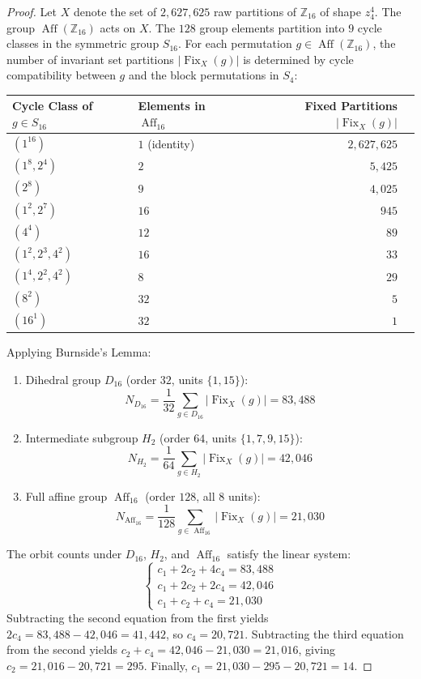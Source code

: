 \begin{proof}
Let $X$ denote the set of $2{,}627{,}625$ raw partitions of $\mathbb{Z}_{16}$ of shape $z_4^4$. The group $\operatorname{Aff}(\mathbb{Z}_{16})$ acts on $X$. The $128$ group elements partition into $9$ cycle classes in the symmetric group $S_{16}$. For each permutation $g \in \operatorname{Aff}(\mathbb{Z}_{16})$, the number of invariant set partitions $|\operatorname{Fix}_X(g)|$ is determined by cycle compatibility between $g$ and the block permutations in $S_4$:
\begin{center}
\begin{tabular}{llrr}
\toprule
Cycle Class of $g \in S_{16}$ & Elements in $\operatorname{Aff}_{16}$ & Fixed Partitions $|\operatorname{Fix}_X(g)|$ \\
\midrule
$(1^{16})$ & $1$ (identity) & $2{,}627{,}625$ \\
$(1^8, 2^4)$ & $2$ & $5{,}425$ \\
$(2^8)$ & $9$ & $4{,}025$ \\
$(1^2, 2^7)$ & $16$ & $945$ \\
$(4^4)$ & $12$ & $89$ \\
$(1^2, 2^3, 4^2)$ & $16$ & $33$ \\
$(1^4, 2^2, 4^2)$ & $8$ & $29$ \\
$(8^2)$ & $32$ & $5$ \\
$(16^1)$ & $32$ & $1$ \\
\bottomrule
\end{tabular}
\end{center}
Applying Burnside's Lemma:
\begin{enumerate}
    \item Dihedral group $D_{16}$ (order $32$, units $\{1, 15\}$):
    \[
    N_{D_{16}} = \frac{1}{32} \sum_{g \in D_{16}} |\operatorname{Fix}_X(g)| = 83{,}488
    \]
    \item Intermediate subgroup $H_2$ (order $64$, units $\{1, 7, 9, 15\}$):
    \[
    N_{H_2} = \frac{1}{64} \sum_{g \in H_2} |\operatorname{Fix}_X(g)| = 42{,}046
    \]
    \item Full affine group $\operatorname{Aff}_{16}$ (order $128$, all $8$ units):
    \[
    N_{\operatorname{Aff}_{16}} = \frac{1}{128} \sum_{g \in \operatorname{Aff}_{16}} |\operatorname{Fix}_X(g)| = 21{,}030
    \]
\end{enumerate}
The orbit counts under $D_{16}$, $H_2$, and $\operatorname{Aff}_{16}$ satisfy the linear system:
\[
\begin{cases}
c_1 + 2c_2 + 4c_4 = 83{,}488 \\
c_1 + 2c_2 + 2c_4 = 42{,}046 \\
c_1 + c_2 + c_4 = 21{,}030
\end{cases}
\]
Subtracting the second equation from the first yields $2c_4 = 83{,}488 - 42{,}046 = 41{,}442$, so $c_4 = 20{,}721$. Subtracting the third equation from the second yields $c_2 + c_4 = 42{,}046 - 21{,}030 = 21{,}016$, giving $c_2 = 21{,}016 - 20{,}721 = 295$. Finally, $c_1 = 21{,}030 - 295 - 20{,}721 = 14$.
\end{proof}
